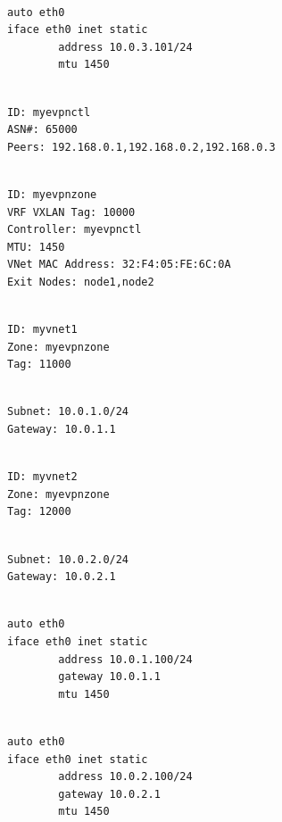 \begin{lstlisting}

auto eth0
iface eth0 inet static
        address 10.0.3.101/24
        mtu 1450

\end{lstlisting}

\begin{lstlisting}

ID: myevpnctl
ASN#: 65000
Peers: 192.168.0.1,192.168.0.2,192.168.0.3

\end{lstlisting}

\begin{lstlisting}

ID: myevpnzone
VRF VXLAN Tag: 10000
Controller: myevpnctl
MTU: 1450
VNet MAC Address: 32:F4:05:FE:6C:0A
Exit Nodes: node1,node2

\end{lstlisting}

\begin{lstlisting}

ID: myvnet1
Zone: myevpnzone
Tag: 11000

\end{lstlisting}

\begin{lstlisting}

Subnet: 10.0.1.0/24
Gateway: 10.0.1.1

\end{lstlisting}

\begin{lstlisting}

ID: myvnet2
Zone: myevpnzone
Tag: 12000

\end{lstlisting}

\begin{lstlisting}

Subnet: 10.0.2.0/24
Gateway: 10.0.2.1

\end{lstlisting}

\begin{lstlisting}

auto eth0
iface eth0 inet static
        address 10.0.1.100/24
        gateway 10.0.1.1
        mtu 1450

\end{lstlisting}

\begin{lstlisting}

auto eth0
iface eth0 inet static
        address 10.0.2.100/24
        gateway 10.0.2.1
        mtu 1450

\end{lstlisting}


